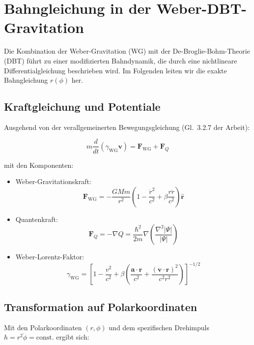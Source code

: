 \section{Bahngleichung in der Weber-DBT-Gravitation}
\label{sec:bahngleichung}

Die Kombination der Weber-Gravitation (WG) mit der De-Broglie-Bohm-Theorie (DBT) führt zu einer modifizierten Bahndynamik, die durch eine nichtlineare Differentialgleichung beschrieben wird. Im Folgenden leiten wir die exakte Bahngleichung $r(\phi)$ her.

\subsection{Kraftgleichung und Potentiale}
Ausgehend von der verallgemeinerten Bewegungsgleichung (Gl.~3.2.7 der Arbeit):

\begin{equation}
m \frac{d}{dt}(\gamma_{\mathrm{WG}}\mathbf{v}) = \mathbf{F}_{\mathrm{WG}} + \mathbf{F}_Q
\end{equation}

mit den Komponenten:
\begin{itemize}
\item Weber-Gravitationskraft:
\begin{equation}
\mathbf{F}_{\mathrm{WG}} = -\frac{GMm}{r^2}\left(1-\frac{\dot{r}^2}{c^2}+\beta\frac{r\ddot{r}}{c^2}\right)\hat{\mathbf{r}}
\end{equation}

\item Quantenkraft:
\begin{equation}
\mathbf{F}_Q = -\nabla Q = \frac{\hbar^2}{2m}\nabla\left(\frac{\nabla^2|\Psi|}{|\Psi|}\right)
\end{equation}

\item Weber-Lorentz-Faktor:
\begin{equation}
\gamma_{\mathrm{WG}} = \left[1-\frac{v^2}{c^2}+\beta\left(\frac{\mathbf{a}\cdot\mathbf{r}}{c^2}+\frac{(\mathbf{v}\cdot\mathbf{r})^2}{c^2r^2}\right)\right]^{-1/2}
\end{equation}
\end{itemize}

\subsection{Transformation auf Polarkoordinaten}
Mit den Polarkoordinaten $(r,\phi)$ und dem spezifischen Drehimpuls $h = r^2\dot{\phi} = \mathrm{const.}$ ergibt sich:

